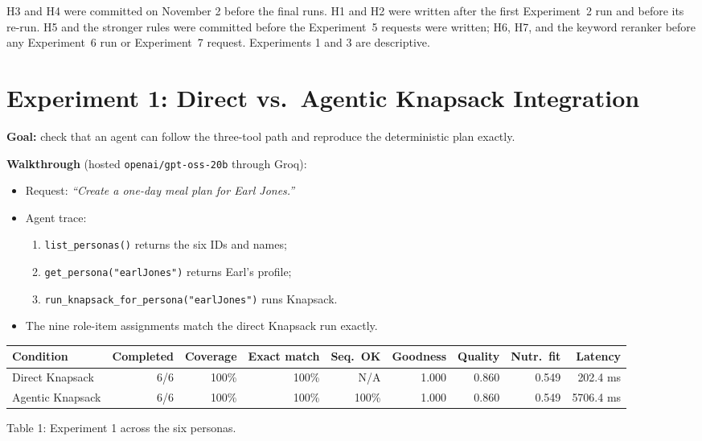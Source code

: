 \documentclass[11pt]{article}
\newcommand{\tool}[1]{\texttt{#1}}
\begin{document}
H3 and H4 were committed on November 2 before the final runs. H1 and H2 were
written after the first Experiment~2 run and before its re-run. H5 and the
stronger rules were committed before the Experiment~5 requests were written;
H6, H7, and the keyword reranker before any Experiment~6 run or Experiment~7
request. Experiments 1 and 3 are descriptive.

\section{Experiment 1: Direct vs.\ Agentic Knapsack Integration}

\textbf{Goal:} check that an agent can follow the three-tool path and reproduce
the deterministic plan exactly.

\textbf{Walkthrough} (hosted \tool{openai/gpt-oss-20b} through Groq):
\begin{itemize}
  \item Request: \emph{``Create a one-day meal plan for Earl Jones.''}
  \item Agent trace:
    \begin{enumerate}
      \item \tool{list\_personas()} returns the six IDs and names;
      \item \tool{get\_persona("earlJones")} returns Earl's profile;
      \item \tool{run\_knapsack\_for\_persona("earlJones")} runs Knapsack.
    \end{enumerate}
  \item The nine role-item assignments match the direct Knapsack run exactly.
\end{itemize}

\begin{center}
\footnotesize\setlength{\tabcolsep}{4pt}
\begin{tabular}{@{}lrrrrrrrr@{}}
\toprule
Condition & Completed & Coverage & Exact match & Seq.\ OK & Goodness & Quality & Nutr.\ fit & Latency \\
\midrule
Direct Knapsack & 6/6 & 100\% & 100\% & N/A & 1.000 & 0.860 & 0.549 & 202.4 ms \\
Agentic Knapsack & 6/6 & 100\% & 100\% & 100\% & 1.000 & 0.860 & 0.549 & 5706.4 ms \\
\bottomrule
\end{tabular}

Table 1: Experiment 1 across the six personas.
\end{center}
\end{document}
